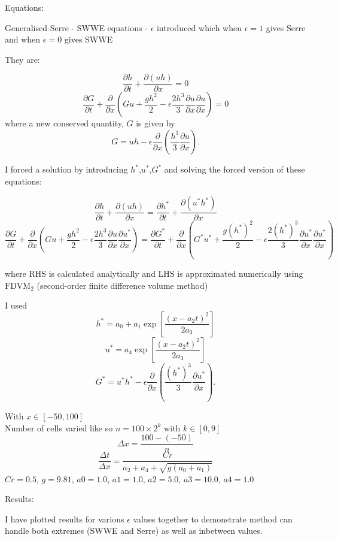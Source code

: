 \documentclass[10pt]{article}
\begin{document}
	Equations:
	
	Generalised Serre - SWWE equations - $\epsilon$ introduced which when $\epsilon =1$ gives Serre and when $\epsilon = 0$ gives SWWE
	
	They are:
	
	\[
	\frac{\partial h}{\partial t} + \frac{\partial (uh)}{\partial x} = 0
	\]
	\[
	\frac{\partial G}{\partial t} + \frac{\partial }{\partial x} \left ( Gu + \frac{gh^2}{2} - \epsilon \frac{2 h^3}{3} \frac{\partial u}{\partial x} \frac{\partial u}{\partial x} \right ) = 0 \]
	where a new conserved quantity, $G$ is given by
	\[
	G = uh - \epsilon \frac{\partial }{\partial x} \left ( \dfrac{h^3}{3} \frac{\partial u}{\partial x} \right ).
	\]
	
	I forced a solution by introducing $h^*$,$u^*$,$G^*$ and solving the forced version of these equations:
	
	\[
	\frac{\partial h}{\partial t} + \frac{\partial (uh)}{\partial x} = \frac{\partial h^*}{\partial t} + \frac{\partial (u^*h^*)}{\partial x}
	\]
	\[
	\frac{\partial G}{\partial t} + \frac{\partial }{\partial x} \left ( Gu + \frac{gh^2}{2} - \epsilon \frac{2 h^3}{3} \frac{\partial u}{\partial x} \frac{\partial u^*}{\partial x} \right ) = \frac{\partial G^*}{\partial t} + \frac{\partial }{\partial x} \left ( G^*u^* + \frac{g(h^*)^2}{2} - \epsilon \frac{2 (h^*)^3}{3} \frac{\partial u^*}{\partial x} \frac{\partial u^*}{\partial x} \right ) \]
	
	where RHS is calculated analytically and LHS is approximated numerically using $\text{FDVM}_2$ (second-order finite difference volume method)
	
	I used 
	\[h^* = a_0 + a_1 \exp \left[ \dfrac{\left(x - a_2 t\right)^2}{2a_3}\right]\]
	\[u^* = a_4 \exp \left[ \dfrac{\left(x - a_2 t\right)^2}{2a_3}\right]\]
	\[
	G^* = u^*h^* - \epsilon \frac{\partial }{\partial x} \left ( \dfrac{(h^*)^3}{3} \frac{\partial u^*}{\partial x} \right ).
	\]
	
	With
	$x \in \left[-50,100\right]$\\
	Number of cells varied like so $n = 100\times2^k$ with $k \in \left[0,9\right]$\\
	$$\Delta x = \frac{100 - (-50)}{n}$$
	$$\frac{\Delta t}{\Delta x} = \frac{Cr}{a_2 + a_4 + \sqrt{g(a_0 + a_1)}}$$
	$Cr = 0.5$, 
	$g =   9.81 $,  
	$a0 =   1.0$,   
	$a1 =   1.0$,   
	$a2 =   5.0$,    
	$a3 =   10.0$,    
	$a4 =   1.0$
	
	Results:
	 
	I have plotted results for various $\epsilon$ values together to demonstrate method can handle both extremes (SWWE and Serre) as well as inbetween values.
	
\end{document}
